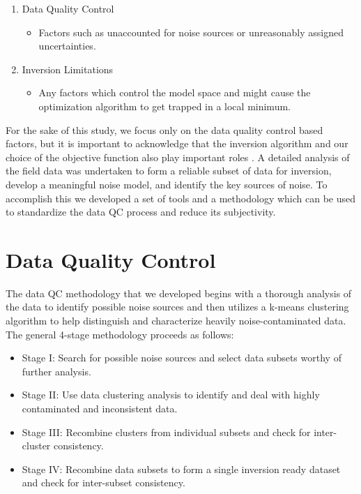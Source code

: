 \documentclass[final,authoryear,5p,times,twocolumn]{elsarticle}
\begin{document}
\begin{enumerate}
   \item Data Quality Control
      \begin{itemize}
         \item Factors such as unaccounted for noise sources or unreasonably assigned uncertainties.
      \end{itemize}
   \item Inversion Limitations
      \begin{itemize}
         \item Any factors which control the model space and might cause the optimization algorithm to get trapped in a local minimum.
      \end{itemize}
\end{enumerate}

For the sake of this study, we focus only on the data quality control based factors, but it is important to acknowledge that the inversion algorithm and our choice of the objective function also play important roles \citep{Farquharson1998,Oldenburg2005}. A detailed analysis of the field data was undertaken to form a reliable subset of data for inversion, develop a meaningful noise model, and identify the key sources of noise. To accomplish this we developed a set of tools and a methodology which can be used to standardize the data QC process and reduce its subjectivity.

\section{Data Quality Control}
\label{Data_Quality_Control}

The data QC methodology that we developed begins with a thorough analysis of the data to identify possible noise sources and then utilizes a k-means clustering algorithm to help distinguish and characterize heavily noise-contaminated data. The general 4-stage methodology proceeds as follows:

\begin{itemize}
    \item Stage I: Search for possible noise sources and select data subsets worthy of further analysis.
    \item Stage II: Use data clustering analysis to identify and deal with highly contaminated and inconsistent data.
    \item Stage III: Recombine clusters from individual subsets and check for inter-cluster consistency.
    \item Stage IV: Recombine data subsets to form a single inversion ready dataset and check for inter-subset consistency.
\end{itemize}
\end{document}
